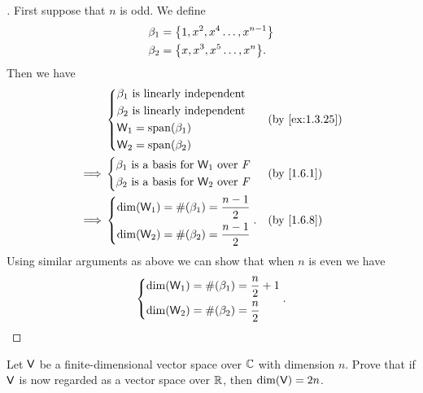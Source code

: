 \begin{proof}[]
  First suppose that \(n\) is odd.
  We define
  \begin{align*}
    \beta_1 & = \set{1, x^2, x^4 \dots, x^{n - 1}} \\
    \beta_2 & = \set{x, x^3, x^5 \dots, x^n}.
  \end{align*}
  Then we have
  \begin{align*}
             & \begin{dcases}
                 \beta_1 \text{ is linearly independent} \\
                 \beta_2 \text{ is linearly independent} \\
                 \W_1 = \spn{\beta_1}                    \\
                 \W_2 = \spn{\beta_2}
               \end{dcases}               &  & \text{(by \cref{ex:1.3.25})} \\
    \implies & \begin{dcases}
                 \beta_1 \text{ is a basis for } \W_1 \text{ over } \F \\
                 \beta_2 \text{ is a basis for } \W_2 \text{ over } \F
               \end{dcases} &  & \text{(by \cref{1.6.1})}        \\
    \implies & \begin{dcases}
                 \dim(\W_1) = \#(\beta_1) = \frac{n - 1}{2} \\
                 \dim(\W_2) = \#(\beta_2) = \frac{n - 1}{2}
               \end{dcases}.            &  & \text{(by \cref{1.6.8})}
  \end{align*}
  Using similar arguments as above we can show that when \(n\) is even we have
  \[
    \begin{dcases}
      \dim(\mathsf{W}_1) = \#(\beta_1) = \frac{n}{2} + 1 \\
      \dim(\mathsf{W}_2) = \#(\beta_2) = \frac{n}{2}
    \end{dcases}.
  \]
\end{proof}

\begin{ex}\label{ex:1.6.28}
  Let \(\mathsf{V}\) be a finite-dimensional vector space over \(\mathbb{C}\) with dimension \(n\).
  Prove that if \(\mathsf{V}\) is now regarded as a vector space over \(\mathbb{R}\), then \(\dim(\mathsf{V}) = 2n\).
\end{ex}

